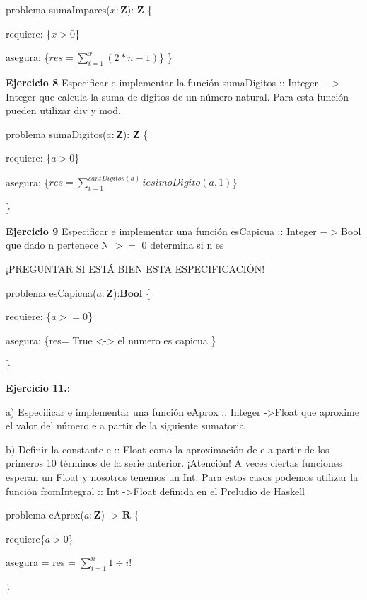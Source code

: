 \documentclass{article}
\begin{document}
problema sumaImpares($x: \mathbf{Z}$): $\mathbf{Z}$ \{
    
    requiere: \{$x>0$\}

    asegura: \{$res = \sum_{i=1}^{x} (2*n-1)$\}
\} \newline

\textbf{Ejercicio 8} Especificar e implementar la función sumaDigitos :: Integer $->$Integer que calcula la suma de dígitos de
un número natural. Para esta función pueden utilizar div y mod. \newline

problema sumaDigitos($a:\mathbf{Z}$): $\mathbf{Z}$ \{
    
    requiere: \{$a > 0$\}


    asegura: \{$res = \sum_{i=1}^{cantDigitos(a)} iesimoDigito(a,1)$\}
    
\}

\textbf{Ejercicio 9} Especificar e implementar una función esCapicua :: Integer $->$Bool que dado n pertenece N $>= $ 0 determina si n es\newline

\begin{alerta}
¡PREGUNTAR SI ESTÁ BIEN ESTA ESPECIFICACIÓN!
\end{alerta}

problema esCapicua($a:\mathbf{Z}$):$\mathbf{Bool}$ \{


    requiere: \{$a>=0$\}

    asegura: \{res= True <-> el numero es capicua \}

    \} \newline

\textbf{Ejercicio 11.}:


a) Especificar e implementar una función eAprox :: Integer ->Float que aproxime el valor del número e
a partir de la siguiente sumatoria


b) Definir la constante e :: Float como la aproximación de e a partir de los primeros 10 términos de la serie anterior.
¡Atención! A veces ciertas funciones esperan un Float y nosotros tenemos un Int. Para estos casos podemos utilizar la
función fromIntegral :: Int ->Float definida en el Preludio de Haskell \newline 


problema eAprox($a:\mathbf{Z}$) -> $\mathbf{R}$ \{
    

    requiere\{$a>0$\}

    asegura = {res = $\sum_{i=1}^{n}  1 \div i!$}

\}\newline
\end{document}
